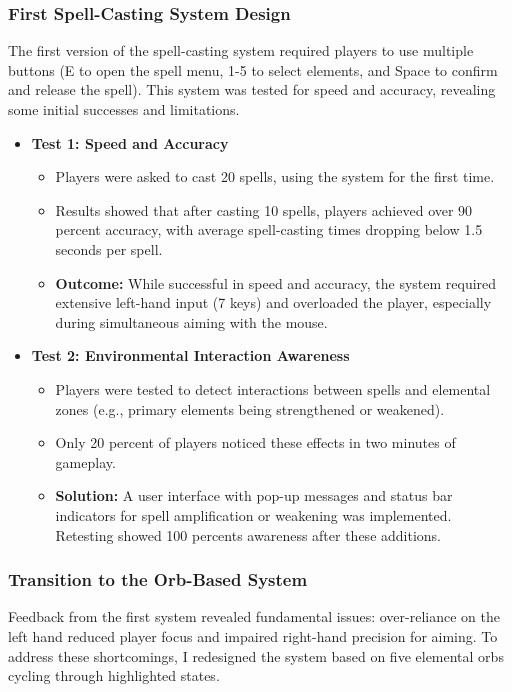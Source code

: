 \documentclass[10pt,twocolumn]{article}
\begin{document}
\subsubsection{First Spell-Casting System Design}
The first version of the spell-casting system required players to use multiple buttons (E to open the spell menu, 1-5 to select elements, and Space to confirm and release the spell). This system was tested for speed and accuracy, revealing some initial successes and limitations.
\begin{itemize}
    \item \textbf{Test 1: Speed and Accuracy}
    \begin{itemize}
        \item Players were asked to cast 20 spells, using the system for the first time.
        \item Results showed that after casting 10 spells, players achieved over 90 percent accuracy, with average spell-casting times dropping below 1.5 seconds per spell.
        \item \textbf{Outcome:} While successful in speed and accuracy, the system required extensive left-hand input (7 keys) and overloaded the player, especially during simultaneous aiming with the mouse.
    \end{itemize}
    \item \textbf{Test 2: Environmental Interaction Awareness}
    \begin{itemize}
        \item Players were tested to detect interactions between spells and elemental zones (e.g., primary elements being strengthened or weakened).
        \item Only 20 percent of players noticed these effects in two minutes of gameplay.
        \item \textbf{Solution:} A user interface with pop-up messages and status bar indicators for spell amplification or weakening was implemented. Retesting showed 100 percents awareness after these additions.       
    \end{itemize}
\end{itemize}

\subsubsection{Transition to the Orb-Based System}
Feedback from the first system revealed fundamental issues: over-reliance on the left hand reduced player focus and impaired right-hand precision for aiming. To address these shortcomings, I redesigned the system based on five elemental orbs cycling through highlighted states.
\end{document}
